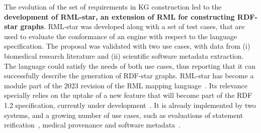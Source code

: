 \begin{itemize}
    The evolution of the set of requirements in KG construction led to the \textbf{development of RML-star, an extension of RML for constructing RDF-star graphs}.
    RML-star was developed along with a set of test cases, that are used to evaluate the conformance of an engine with respect to the language specification. 
    The proposal was validated with two use cases, with data from (i) biomedical research literature and (ii) scientific software metadata extraction. 
    The language could satisfy the needs of both use cases, thus reporting that it can successfully describe the generation of RDF-star graphs. 
    RML-star has become a module part of the 2023 revision of the RML mapping language~\parencite{iglesias2023rml}. Its relevance specially relies on the uptake of a new feature that will become part of the RDF 1.2 specification, currently under development~\parencite{hartig2023rdf}. 
    It is already implemented by two systems, and a growing number of use cases, such as evaluations of statement reification~\parencite{kieffer2023evaluating,iglesias2023reconstruction}, medical provenance 
    and software metadata~\parencite{iglesias2023fair-software-bp}.
    

\end{itemize}
